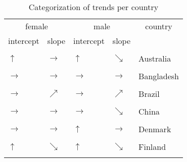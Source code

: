 \begin{table}[!h]

\caption{Categorization of trends per country}
\centering
\begin{tabular}[t]{lllll}
\toprule
\multicolumn{2}{c}{female} & \multicolumn{2}{c}{male} & \multicolumn{1}{c}{country} \\
\cmidrule(l{3pt}r{3pt}){1-2} \cmidrule(l{3pt}r{3pt}){3-4} \cmidrule(l{3pt}r{3pt}){5-5}
intercept & slope & intercept & slope & \\
\midrule
\cellcolor{gray!6}{$\rightarrow$} & \cellcolor{gray!6}{$\nearrow$} & \cellcolor{gray!6}{$\uparrow$} & \cellcolor{gray!6}{$\rightarrow$} & \cellcolor{gray!6}{Argentina}\\
$\uparrow$ & $\rightarrow$ & $\uparrow$ & $\searrow$ & Australia\\
\cellcolor{gray!6}{$\rightarrow$} & \cellcolor{gray!6}{$\rightarrow$} & \cellcolor{gray!6}{$\uparrow$} & \cellcolor{gray!6}{$\rightarrow$} & \cellcolor{gray!6}{Austria}\\
$\rightarrow$ & $\rightarrow$ & $\rightarrow$ & $\rightarrow$ & Bangladesh\\
\cellcolor{gray!6}{$\rightarrow$} & \cellcolor{gray!6}{$\rightarrow$} & \cellcolor{gray!6}{$\uparrow$} & \cellcolor{gray!6}{$\rightarrow$} & \cellcolor{gray!6}{Belgium}\\
\addlinespace
$\rightarrow$ & $\nearrow$ & $\rightarrow$ & $\nearrow$ & Brazil\\
\cellcolor{gray!6}{$\uparrow$} & \cellcolor{gray!6}{$\rightarrow$} & \cellcolor{gray!6}{$\uparrow$} & \cellcolor{gray!6}{$\searrow$} & \cellcolor{gray!6}{Canada}\\
$\rightarrow$ & $\rightarrow$ & $\rightarrow$ & $\searrow$ & China\\
\cellcolor{gray!6}{$\uparrow$} & \cellcolor{gray!6}{$\rightarrow$} & \cellcolor{gray!6}{$\uparrow$} & \cellcolor{gray!6}{$\rightarrow$} & \cellcolor{gray!6}{Colombia}\\
$\rightarrow$ & $\rightarrow$ & $\uparrow$ & $\rightarrow$ & Denmark\\
\addlinespace
\cellcolor{gray!6}{$\rightarrow$} & \cellcolor{gray!6}{$\rightarrow$} & \cellcolor{gray!6}{$\uparrow$} & \cellcolor{gray!6}{$\rightarrow$} & \cellcolor{gray!6}{Egypt}\\
$\uparrow$ & $\searrow$ & $\uparrow$ & $\searrow$ & Finland\\
\cellcolor{gray!6}{$\rightarrow$} & \cellcolor{gray!6}{$\searrow$} & \cellcolor{gray!6}{$\uparrow$} & \cellcolor{gray!6}{$\rightarrow$} & \cellcolor{gray!6}{France}\\

\end{tabular}
\end{table}
